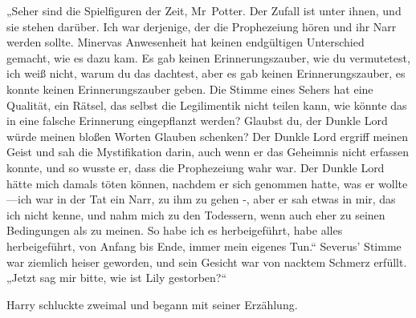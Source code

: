 „Seher sind die Spielfiguren der Zeit, Mr~Potter. Der Zufall ist unter ihnen, und sie stehen darüber. Ich war derjenige, der die Prophezeiung hören und ihr Narr werden sollte. Minervas Anwesenheit hat keinen endgültigen Unterschied gemacht, wie es dazu kam. Es gab keinen Erinnerungszauber, wie du vermutetest, ich weiß nicht, warum du das dachtest, aber es gab keinen Erinnerungszauber, es konnte keinen Erinnerungszauber geben. Die Stimme eines Sehers hat eine Qualität, ein Rätsel, das selbst die Legilimentik nicht teilen kann, wie könnte das in eine falsche Erinnerung eingepflanzt werden? Glaubst du, der Dunkle Lord würde meinen bloßen Worten Glauben schenken? Der Dunkle Lord ergriff meinen Geist und sah die Mystifikation darin, auch wenn er das Geheimnis nicht erfassen konnte, und so wusste er, dass die Prophezeiung wahr war. Der Dunkle Lord hätte mich damals töten können, nachdem er sich genommen hatte, was er wollte—ich war in der Tat ein Narr, zu ihm zu gehen -, aber er sah etwas in mir, das ich nicht kenne, und nahm mich zu den Todessern, wenn auch eher zu seinen Bedingungen als zu meinen. So habe ich es herbeigeführt, habe alles herbeigeführt, von Anfang bis Ende, immer mein eigenes Tun.“
Severus' Stimme war ziemlich heiser geworden, und sein Gesicht war von nacktem Schmerz erfüllt.
„Jetzt sag mir bitte, wie ist Lily gestorben?“

Harry schluckte zweimal und begann mit seiner Erzählung.

